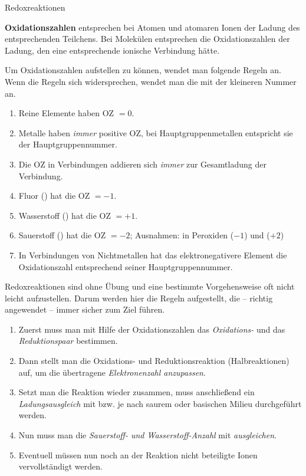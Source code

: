 \documentclass{scrartcl}
\begin{document}
\begin{center}
  \Huge\sffamily Redoxreaktionen
\end{center}


\begin{definition}
  \textbf{Oxidationszahlen} entsprechen bei Atomen und atomaren Ionen der
  Ladung des entsprechenden Teilchens. Bei Molekülen entsprechen die
  Oxidationszahlen der Ladung, den eine entsprechende ionische Verbindung
  hätte.
\end{definition}%
Um Oxidationszahlen aufstellen zu können, wendet man folgende Regeln an. Wenn
die Regeln sich widersprechen, wendet man die mit der kleineren Nummer an.
\begin{enumerate}[label=\arabic*.]
  \item Reine Elemente haben OZ $=0$.
  \item Metalle haben \emph{immer} positive OZ, bei Hauptgruppenmetallen
    entspricht sie der Hauptgruppennummer.
  \item Die OZ in Verbindungen addieren sich \emph{immer} zur Gesamtladung der
    Verbindung.
  \item Fluor () hat die OZ $=-1$.
  \item Wasserstoff () hat die OZ $=+1$.
  \item Sauerstoff () hat die OZ $=-2$; Ausnahmen: in Peroxiden ($-1$)
    und  ($+2$)
  \item In Verbindungen von Nichtmetallen hat das elektronegativere Element
    die Oxidationszahl entsprechend seiner Hauptgruppennummer.
\end{enumerate}


Redoxreaktionen sind ohne Übung und eine bestimmte Vorgehensweise oft nicht
leicht aufzustellen. Darum werden hier die Regeln aufgestellt, die -- richtig
angewendet -- immer sicher zum Ziel führen.
\begin{enumerate}[label=\arabic*.]
  \item Zuerst muss man mit Hilfe der Oxidationszahlen das \emph{Oxidations-}
    und das \emph{Reduktionspaar} bestimmen.
  \item Dann stellt man die Oxidations- und Reduktionsreaktion
    (Halbreaktionen) auf, um die übertragene \emph{Elektronenzahl anzupassen}.
  \item Setzt man die Reaktion wieder zusammen, muss anschließend ein
    \emph{Ladungsausgleich} mit  bzw.  je nach saurem oder
    basischen Milieu durchgeführt werden.
  \item Nun muss man die \emph{Sauerstoff- und Wasserstoff-Anzahl} mit
     \emph{ausgleichen}.
  \item Eventuell müssen nun noch an der Reaktion nicht beteiligte Ionen
    vervollständigt werden.
\end{enumerate}
\end{document}
